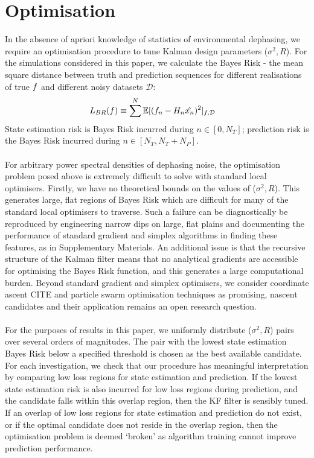 \section{Optimisation}  \label{sec:main:3}

In the absence of apriori knowledge of statistics of environmental dephasing, we require an optimisation procedure to tune Kalman design parameters ($\sigma^2, R$). For the simulations considered in this paper, we calculate the Bayes Risk - the mean square distance between truth and prediction sequences for different realisations of true $f$ and different noisy datasets $\mathcal{D}$:
\begin{align}
L_{BR}(f) & \equiv \sum^{N}\mathbb{E}[(f_n - H_n\hat{x_n})^2]_{f,\mathcal{D}} \label{eqn:sec:ap_opt_LossBR}
\end{align}
State estimation risk is Bayes Risk incurred during $n \in [0, N_T]$; prediction risk is the Bayes Risk incurred during $n \in [N_T, N_T + N_P]$. 
\\
\\
For arbitrary power spectral densities of dephasing noise, the optimisation problem posed above is extremely difficult to solve with standard local optimisers. Firstly, we have no theoretical bounds on the values of ($\sigma^2, R$). This generates large, flat regions of Bayes Risk which are difficult for many of the standard local optimisers to traverse. Such a failure can be diagnostically be reproduced by engineering narrow dips on large, flat plains and documenting the performance of standard gradient and simplex algorithms in finding these features, as in Supplementary Materials. An additional issue is that the recursive structure of the Kalman filter means that no analytical gradients are accessible  for optimising the Bayes Risk function, and this generates a large computational burden. Beyond standard gradient and simplex optimisers, we consider coordinate ascent CITE and particle swarm optimisation techniques as promising, nascent candidates and their application remains an open research question. 
\\
\\
For the purposes of results in this paper, we uniformly distribute ($\sigma^2, R$) pairs over several orders of magnitudes. The pair with the lowest state estimation Bayes Risk below a specified threshold is chosen as the best available candidate. For each investigation, we check that our procedure has meaningful interpretation by comparing low loss regions for state estimation and prediction. If the lowest state estimation risk is also incurred for low loss regions during prediction, and the candidate falls within this overlap region, then the KF filter is sensibly tuned. If an overlap of low loss regions  for state estimation and prediction do not exist, or if the optimal candidate does not reside in the overlap region, then the optimisation problem is deemed `broken' as algorithm training cannot improve prediction performance. 

